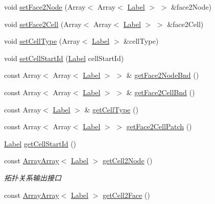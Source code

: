 \begin{DoxyCompactItemize}
\item 
void \hyperlink{classHSF_1_1Topology_ad5dc6fbfb70d53bc41c616b747f5b9a4}{setFace2Node} (Array$<$ Array$<$ \hyperlink{namespaceHSF_ae65d72be782e989396ebe5ec6ae4c2b6}{Label} $>$ $>$ \&face2Node)
\item 
void \hyperlink{classHSF_1_1Topology_a61f5c30ee928367a573f8b4b139ecd8f}{setFace2Cell} (Array$<$ Array$<$ \hyperlink{namespaceHSF_ae65d72be782e989396ebe5ec6ae4c2b6}{Label} $>$ $>$ \&face2Cell)
\item 
void \hyperlink{classHSF_1_1Topology_a42c3fe3a125b6b4576aeea273a9c849c}{setCellType} (Array$<$ \hyperlink{namespaceHSF_ae65d72be782e989396ebe5ec6ae4c2b6}{Label} $>$ \&cellType)
\item 
void \hyperlink{classHSF_1_1Topology_a531b20b476fb3cfc39526e949f20bb27}{setCellStartId} (\hyperlink{namespaceHSF_ae65d72be782e989396ebe5ec6ae4c2b6}{Label} cellStartId)
\item 
const Array$<$ Array$<$ \hyperlink{namespaceHSF_ae65d72be782e989396ebe5ec6ae4c2b6}{Label} $>$ $>$ \& \hyperlink{classHSF_1_1Topology_afda78d036de3096e8da7fe88705b2371}{getFace2NodeBnd} ()
\item 
const Array$<$ Array$<$ \hyperlink{namespaceHSF_ae65d72be782e989396ebe5ec6ae4c2b6}{Label} $>$ $>$ \& \hyperlink{classHSF_1_1Topology_a44ed8e5128084d2385a0dfa8f0fb525c}{getFace2CellBnd} ()
\item 
const Array$<$ \hyperlink{namespaceHSF_ae65d72be782e989396ebe5ec6ae4c2b6}{Label} $>$ \& \hyperlink{classHSF_1_1Topology_a1450bccac8167a83983fc8e91a1a68cf}{getCellType} ()
\item 
const Array$<$ Array$<$ \hyperlink{namespaceHSF_ae65d72be782e989396ebe5ec6ae4c2b6}{Label} $>$ $>$ \hyperlink{classHSF_1_1Topology_a89d020dbaa3624a7b01d10e0c3249f28}{getFace2CellPatch} ()
\item 
\hyperlink{namespaceHSF_ae65d72be782e989396ebe5ec6ae4c2b6}{Label} \hyperlink{classHSF_1_1Topology_ac1ec1876bb50ca29391873e550b11efa}{getCellStartId} ()
\item 
const \hyperlink{classHSF_1_1ArrayArray}{ArrayArray}$<$ \hyperlink{namespaceHSF_ae65d72be782e989396ebe5ec6ae4c2b6}{Label} $>$ \hyperlink{classHSF_1_1Topology_a4773996f5f708d964b87256318266497}{getCell2Node} ()
\begin{DoxyCompactList}\small\item\em 拓扑关系输出接口 \item\end{DoxyCompactList}\item 
const \hyperlink{classHSF_1_1ArrayArray}{ArrayArray}$<$ \hyperlink{namespaceHSF_ae65d72be782e989396ebe5ec6ae4c2b6}{Label} $>$ \hyperlink{classHSF_1_1Topology_af95390ff895b1f2f0f419c944627a02f}{getCell2Face} ()

\end{DoxyCompactItemize}
